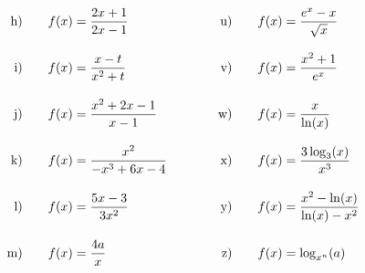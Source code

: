 \begin{exercise}
\begin{alignat*}{5}
        \text{h)\vstrut}&\quad & \xch & \quad&\quad & \text{u)\vstrut}&\quad & \xcu \\
        \text{i)\vstrut}&\quad & \xci & \quad&\quad & \text{v)\vstrut}&\quad & \xcv \\
        \text{j)\vstrut}&\quad & \xcj & \quad&\quad & \text{w)\vstrut}&\quad & \xcw \\
        \text{k)\vstrut}&\quad & \xck & \quad&\quad & \text{x)\vstrut}&\quad & \xcx \\
        \text{l)\vstrut}&\quad & \xcl & \quad&\quad & \text{y)\vstrut}&\quad & \xcy \\
        \text{m)\vstrut}&\quad & \xcm & \quad&\quad & \text{z)\vstrut}&\quad & \xcz
      \end{alignat*}
    \endgroup
  \fi
\end{exercise}
